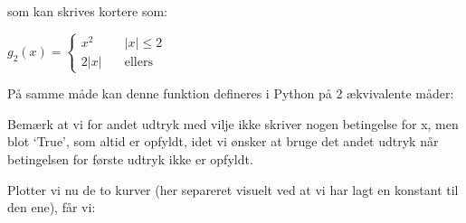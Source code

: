 \documentclass[letterpaper,10pt,english]{jupyterBook}
\begin{document}
som kan skrives kortere som:

\(g_2(x) = \begin{cases} x^2 \quad &|x|\leq 2\\ 2|x| \quad &\mbox{ellers}\end{cases}\)

På samme måde kan denne funktion defineres i Python på 2 ækvivalente måder:

\begin{sphinxVerbatim}[commandchars=\\\{\}]
        
        
\end{sphinxVerbatim}

Bemærk at vi for andet udtryk med vilje ikke skriver nogen betingelse for x, men blot ‘True’, som altid er opfyldt, idet vi ønsker at bruge det andet udtryk når betingelsen for første udtryk  ikke er opfyldt.

Plotter vi nu de to kurver (her separeret visuelt ved at vi har lagt en konstant til den ene), får vi:

\begin{sphinxVerbatim}[commandchars=\\\{\}]
              
\PYG{p}{[}\PYG{p}{]}  
\PYG{p}{[}\PYG{p}{]}  
\end{sphinxVerbatim}
\end{document}
